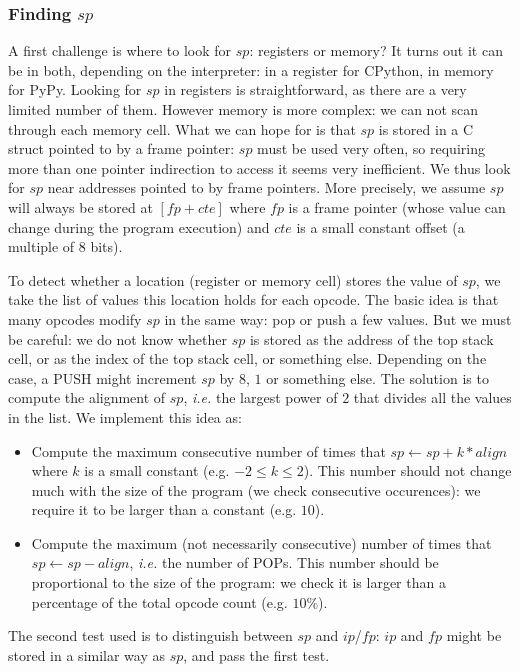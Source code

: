 \documentclass[english]{article}
\begin{document}
\subsubsection{Finding $sp$}

A first challenge is where to look for $sp$: registers or memory? It turns out it can be in both, depending on the interpreter: in a register for CPython, in memory for PyPy. Looking for $sp$ in registers is straightforward, as there are a very limited number of them. However memory is more complex: we can not scan through each memory cell. What we can hope for is that $sp$ is stored in a C struct pointed to by a frame pointer: $sp$ must be used very often, so requiring more than one pointer indirection to access it seems very inefficient. We thus look for $sp$ near addresses pointed to by frame pointers.  More precisely, we assume $sp$ will always be stored at $[fp + cte]$ where $fp$ is a frame pointer (whose value can change during the program execution) and $cte$ is a small constant offset (a multiple of 8 bits).

To detect whether a location (register or memory cell) stores the value of $sp$, we take the list of values this location holds for each opcode. The basic idea is that many opcodes modify $sp$ in the same way: pop or push a few values. But we must be careful: we do not know whether $sp$ is stored as the address of the top stack cell, or as the index of the top stack cell, or something else. Depending on the case, a PUSH might increment $sp$ by $8$, $1$ or something else. The solution is to compute the alignment of $sp$, \textit{i.e.} the largest power of $2$ that divides all the values in the list. We implement this idea as:
\begin{itemize}
	\item Compute the maximum consecutive number of times that $sp \leftarrow sp + k*align$ where $k$ is a small constant (e.g. $-2 \leq k \leq 2$). This number should not change much with the size of the program (we check consecutive occurences): we require it to be larger than a constant (e.g. $10$).
	\item Compute the maximum (not necessarily consecutive) number of times that $sp \leftarrow sp - align$, \textit{i.e.} the number of POPs. This number should be proportional to the size of the program: we check it is larger than a percentage of the total opcode count (e.g. $10\%$).
\end{itemize}
The second test used is to distinguish between $sp$ and $ip$/$fp$: $ip$ and $fp$ might be stored in a similar way as $sp$, and pass the first test. 
\end{document}
